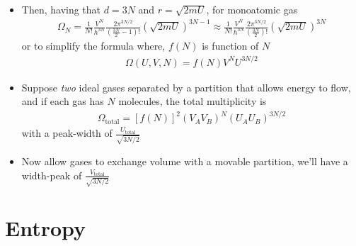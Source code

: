 \documentclass{book}
\begin{document}
\begin{itemize}
	\item Then, having that $d=3N$ and $r=\sqrt{2mU}$, for monoatomic gas
	      \begin{align}
		      \Omega_N = \frac{1}{N!} \frac{V^N}{h^{3N}} \frac{2\pi^{3N/2}}{(\frac{3N}{2} - 1)!}
		      (\sqrt{2mU})^{3N-1} \approx
		      \frac{1}{N!} \frac{V^N}{h^{3N}} \frac{2\pi^{3N/2}}{(\frac{3N}{2})!}
		      (\sqrt{2mU})^{3N}
	      \end{align}
	      or to simplify the formula where,  $f(N)$ is function of $N$
	      \begin{align}
		      \label{eq:multiplicity simple}
		      \Omega (U, V, N) = f(N) V^N U^{3N/2}
	      \end{align}
	\item Suppose \textit{two} ideal gases separated by a partition that allows
	      energy to flow, and if each gas has $N$ molecules, the total multiplicity is
	      \begin{align}
		      \Omega_{\text{total}} = [f(N)]^2 (V_A V_B)^N (U_A U_B)^{3N/2}
	      \end{align}
	      with a peak-width of $\frac{U_{\text{total}}}{\sqrt{3N/2}}$
	\item Now allow gases to exchange volume with a movable partition, we'll have
	      a width-peak of $\frac{V_{\text{total}}}{\sqrt{3N/2}}$

\end{itemize}

\section{Entropy}%
\label{sec:entropy}
\end{document}
